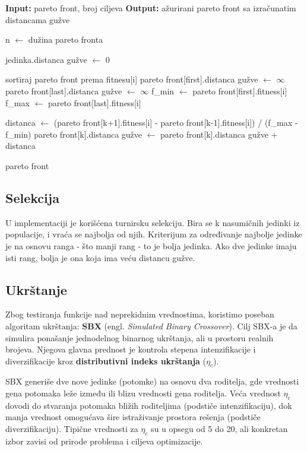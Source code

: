 \documentclass[12pt]{article}
\begin{document}
\begin{algorithmic}[1]
\STATE \textbf{Input:} pareto front, broj ciljeva
\STATE \textbf{Output:} ažurirani pareto front sa izračunatim distancama gužve

\STATE n $\gets$ dužina pareto fronta

    \STATE jedinka.distanca gužve $\gets$ 0
\ENDFOR

    \STATE sortiraj pareto front prema fitnesu[i]
    \STATE pareto front[first].distanca gužve $\gets$ \(\infty\)
    \STATE pareto front[last].distanca gužve $\gets$ \(\infty\)
    \STATE f\_min $\gets$ pareto front[first].fitness[i]
    \STATE f\_max $\gets$ pareto front[last].fitness[i]

        \STATE distanca $\gets$ (pareto front[k+1].fitness[i] - pareto front[k-1].fitness[i]) / (f\_max - f\_min)
        \STATE pareto front[k].distanca gužve $\gets$ pareto front[k].distanca gužve + distanca
    \ENDFOR
\ENDFOR

\RETURN pareto front
\end{algorithmic}

\subsection{Selekcija}
U implementaciji je korišćena turnirsku selekciju. Bira se k nasumičnih jedinki iz populacije, i vraća se najbolja od njih. Kriterijum za određivanje najbolje jedinke je na osnovu ranga - što manji rang - to je bolja jedinka. Ako dve jedinke imaju isti rang, bolja je ona koja ima veću distancu gužve.

\subsection{Ukrštanje}
Zbog testiranja funkcije nad neprekidnim vrednostima, koristimo poseban algoritam ukrštanja: \textbf{SBX} (engl. \textit{Simulated Binary Crossover}). 
Cilj SBX-a je da simulira ponašanje jednodelnog binarnog ukrštanja, ali u prostoru realnih brojeva. Njegova glavna prednost je kontrola stepena intenzifikacije i diverzifikacije kroz \textbf{distributivni indeks ukrštanja} ($\eta_c$). 

SBX generiše dve nove jedinke (potomke) na osnovu dva roditelja, gde vrednosti gena potomaka leže između ili blizu vrednosti gena roditelja. Veća vrednost $\eta_c$ dovodi do stvaranja potomaka bližih roditeljima (podstiče intenzifikaciju), dok manja vrednost omogućava šire istraživanje prostora rešenja (podstiče diverzifikaciju).
Tipične vrednosti za $\eta_c$ su u opsegu od 5 do 20, ali konkretan izbor zavisi od prirode problema i ciljeva optimizacije.
\end{document}
